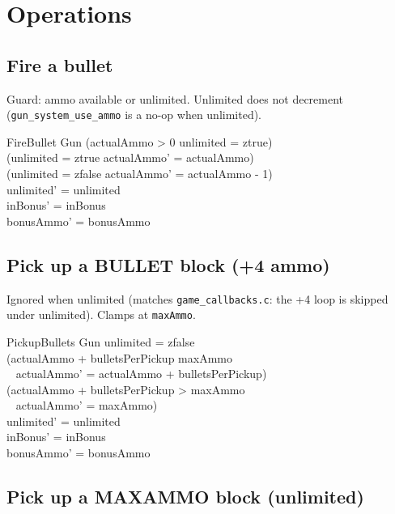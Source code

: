 \documentclass[a4paper,10pt,fleqn]{article}
\begin{document}
\section{Operations}

\subsection{Fire a bullet}

Guard: ammo available or unlimited.  Unlimited does not decrement
(\texttt{gun\_system\_use\_ammo} is a no-op when unlimited).

\begin{schema}{FireBullet}
\Delta Gun
\where
(actualAmmo > 0 \lor unlimited = ztrue) \\
\land (unlimited = ztrue \implies actualAmmo' = actualAmmo) \\
\land (unlimited = zfalse \implies actualAmmo' = actualAmmo - 1) \\
unlimited' = unlimited \\
inBonus' = inBonus \\
bonusAmmo' = bonusAmmo
\end{schema}

\subsection{Pick up a BULLET block (+4 ammo)}

Ignored when unlimited (matches \texttt{game\_callbacks.c}: the +4 loop
is skipped under unlimited).  Clamps at \texttt{maxAmmo}.

\begin{schema}{PickupBullets}
\Delta Gun
\where
unlimited = zfalse \\
\land (actualAmmo + bulletsPerPickup \leq maxAmmo \\
\quad~ \implies actualAmmo' = actualAmmo + bulletsPerPickup) \\
\land (actualAmmo + bulletsPerPickup > maxAmmo \\
\quad~ \implies actualAmmo' = maxAmmo) \\
unlimited' = unlimited \\
inBonus' = inBonus \\
bonusAmmo' = bonusAmmo
\end{schema}

\subsection{Pick up a MAXAMMO block (unlimited)}
\end{document}
